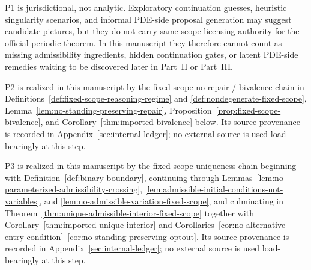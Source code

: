 \begin{remark}\label{rem:ametric-application-pde-misread}
P1 is jurisdictional, not analytic. Exploratory continuation guesses, heuristic singularity scenarios, and informal PDE-side proposal generation may suggest candidate pictures, but they do not carry same-scope licensing authority for the official periodic theorem. In this manuscript they therefore cannot count as missing admissibility ingredients, hidden continuation gates, or latent PDE-side remedies waiting to be discovered later in Part~II or Part~III.
\end{remark}

\begin{remark}\label{rem:p2-proof-location}
P2 is realized in this manuscript by the fixed-scope no-repair / bivalence chain in Definitions~\ref{def:fixed-scope-reasoning-regime} and \ref{def:nondegenerate-fixed-scope}, Lemma~\ref{lem:no-standing-preserving-repair}, Proposition~\ref{prop:fixed-scope-bivalence}, and Corollary~\ref{thm:imported-bivalence} below. Its source provenance is recorded in Appendix~\ref{sec:internal-ledger}; no external source is used load-bearingly at this step.
\end{remark}

\begin{remark}\label{rem:p3-proof-location}
P3 is realized in this manuscript by the fixed-scope uniqueness chain beginning with Definition~\ref{def:binary-boundary}, continuing through Lemmas~\ref{lem:no-parameterized-admissibility-crossing}, \ref{lem:admissible-initial-conditions-not-variables}, and \ref{lem:no-admissible-variation-fixed-scope}, and culminating in Theorem~\ref{thm:unique-admissible-interior-fixed-scope} together with Corollary~\ref{thm:imported-unique-interior} and Corollaries~\ref{cor:no-alternative-entry-condition}--\ref{cor:no-standing-preserving-optout}. Its source provenance is recorded in Appendix~\ref{sec:internal-ledger}; no external source is used load-bearingly at this step.
\end{remark}

